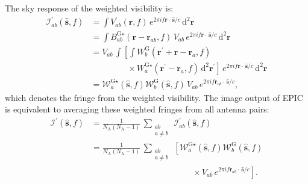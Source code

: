 \documentclass[a4paper,fleqn,usenatbib]{mnras}
\newcommand{\Nant}{N_\textrm{A}}
\newcommand{\dif}{\mathrm{d}}
\begin{document}
The sky response of the weighted visibility is:
\begin{align}
  \mathcal{I}^\prime_{ab}(\hat{\mathbf{s}},f) &= \int V^\prime_{ab}(\mathbf{r},f)\,e^{2\pi i f\mathbf{r}\cdot\,\hat{\mathbf{s}}/c}\,\dif^2\mathbf{r} \nonumber\\
                                              &= \int B^{\textrm{G}\star}_{ab}(\mathbf{r}-\mathbf{r}_{ab},f)\,V_{ab}\,e^{2\pi i f\mathbf{r}\cdot\,\hat{\mathbf{s}}/c}\,\dif^2\mathbf{r} \nonumber\\
                                              &= V_{ab}\,\int \left[\int W^\textrm{G}_b(\mathbf{r}^\prime+\mathbf{r}-\mathbf{r}_a,f)\right. \nonumber\\
                                              &\qquad\qquad\,\,\, \left.\times\, W^{\textrm{G}\star}_a(\mathbf{r}^\prime-\mathbf{r}_a,f)\,\dif^2\mathbf{r}^\prime\right]\,e^{2\pi i f\mathbf{r}\cdot\,\hat{\mathbf{s}}/c}\,\dif^2\mathbf{r} \nonumber\\
                                              &= \mathcal{W}^{\textrm{G}\star}_a(\hat{\mathbf{s}},f)\mathcal{W}^\textrm{G}_b(\hat{\mathbf{s}},f)\,V_{ab}\,e^{2\pi i f\mathbf{r}_{ab}\!\cdot\,\hat{\mathbf{s}}/c},
\end{align}
which denotes the fringe from the weighted visibility. The image output of EPIC is equivalent to averaging these weighted fringes from all antenna pairs:
\begin{align}\label{eqn:apndx-wt-dirty-image-EPIC}
  \mathcal{I}^\prime(\hat{\mathbf{s}},f) &= \frac{1}{\Nant(\Nant-1)}\,\sum_{\substack{ab\\a\ne b}}\,\mathcal{I}^\prime_{ab}(\hat{\mathbf{s}},f) \nonumber\\
                                         &= \frac{1}{\Nant(\Nant-1)}\,\sum_{\substack{ab\\a\ne b}}\,\left[\mathcal{W}^{\textrm{G}\star}_a(\hat{\mathbf{s}},f)\mathcal{W}^\textrm{G}_b(\hat{\mathbf{s}},f)\right. \nonumber\\
  &\qquad\qquad\qquad\qquad\qquad\qquad \times \left. V_{ab}\,e^{2\pi i f\mathbf{r}_{ab}\!\cdot\,\hat{\mathbf{s}}/c}\right].
\end{align}
\end{document}
